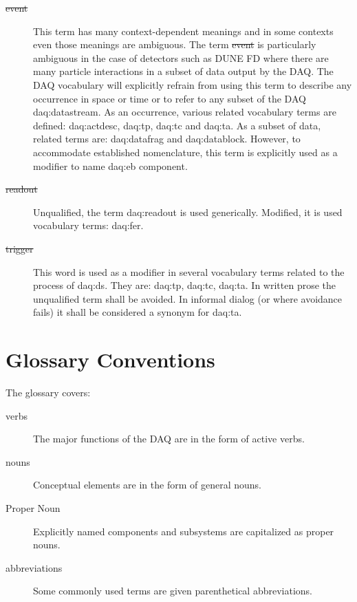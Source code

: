 \documentclass[letterpaper,article,oneside]{memoir}
\begin{document}
\begin{description}
\item[\sout{event}] This term has many context-dependent meanings and
  in some contexts even those meanings are ambiguous. 
  The term \sout{event} is particularly ambiguous in the case of
  detectors such as DUNE FD where there are many particle interactions
  in a subset of data output by the DAQ.
  The DAQ vocabulary will explicitly
  refrain from using this term to describe any occurrence in space or
  time or to refer to any subset of the DAQ \gls{daq:datastream}. 
  As an occurrence, various related vocabulary terms are defined:
  \gls{daq:actdesc}, \gls{daq:tp}, \gls{daq:tc} and \gls{daq:ta}. 
  As a subset of data, related terms are: \gls{daq:datafrag} and
  \gls{daq:datablock}. 
  However, to accommodate established nomenclature, this term is
  explicitly used as a modifier to name \gls{daq:eb} component.
\item[\sout{readout}] Unqualified, the term \gls{daq:readout} is used
  generically. 
  Modified, it is used vocabulary terms: \gls{daq:fer}.
\item[\sout{trigger}] This word is used as a modifier in several vocabulary
  terms related to the process of \gls{daq:ds}. 
  They are: \gls{daq:tp}, \gls{daq:tc}, \gls{daq:ta}. 
  In written prose the unqualified term shall be avoided. 
  In informal dialog (or where avoidance fails) it shall be considered
  a synonym for \gls{daq:ta}.
\end{description}


\section{Glossary Conventions}

The glossary covers:

\begin{description}
\item[verbs] The major functions of the DAQ are in the form of active verbs.
\item[nouns] Conceptual elements are in the form of general nouns.
\item[Proper Noun] Explicitly named components and subsystems are capitalized as proper nouns.
\item[abbreviations] Some commonly used terms are given parenthetical abbreviations.
\end{description}

\printnoidxglossary[type=daq]

\glsaddallunused
\end{document}
